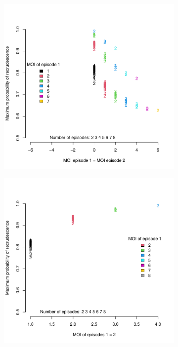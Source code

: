 \documentclass{article}
\begin{document}
\begin{figure}[h]
\begin{subfigure}{.5\textwidth}
  \caption{}
  \label{fig:MOIEqual_reinfection}
\end{subfigure} \\
\begin{subfigure}{.5\textwidth}
  \centering
  \includegraphics[width=0.9\linewidth]{figures/MOIDiff_recrudescence.pdf}
  \caption{}
  \label{fig:MOIDiff_recrudescence}
\end{subfigure}
\begin{subfigure}{.5\textwidth}
  \centering
  \includegraphics[width=0.9\linewidth]{figures/MOIEqual_recrudescence.pdf}
  \caption{}
  \label{fig:MOIEqual_recrudescence}
\end{subfigure} \\


\end{figure}
\end{document}
